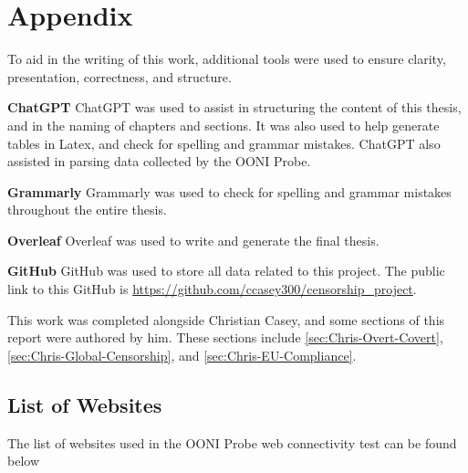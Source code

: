 \chapter{Appendix}
\label{sec:Appendix}

To aid in the writing of this work, additional tools were used to ensure clarity, presentation, correctness, and structure.

\textbf{ChatGPT} ChatGPT was used to assist in structuring the content of this thesis, and in the naming of chapters and sections. It was also used to help generate tables in Latex, and check for spelling and grammar mistakes. ChatGPT also assisted in parsing data collected by the OONI Probe.

\textbf{Grammarly} Grammarly was used to check for spelling and grammar mistakes throughout the entire thesis.

\textbf{Overleaf} Overleaf was used to write and generate the final thesis.

\textbf{GitHub} GitHub was used to store all data related to this project. The public link to this GitHub is \url{https://github.com/ccasey300/censorship_project}.

This work was completed alongside Christian Casey, and some sections of this report were authored by him. These sections include \ref{sec:Chris-Overt-Covert}, \ref{sec:Chris-Global-Censorship}, and \ref{sec:Chris-EU-Compliance}.

\section{List of Websites}

The list of websites used in the OONI Probe web connectivity test can be found below

